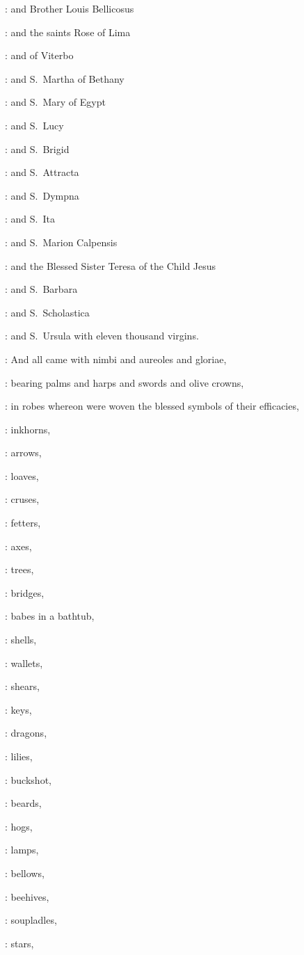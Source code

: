 :
and Brother Louis Bellicosus 

:
and the saints Rose of Lima 

:
and of Viterbo 

:
and S.~Martha of Bethany 

:
and S.~Mary of Egypt 

:
and S.~Lucy 

:
and S.~Brigid 

:
and S.~Attracta 

:
and S.~Dympna 

:
and S.~Ita 

:
and S.~Marion Calpensis 

:
and the Blessed Sister Teresa of the Child Jesus 

:
and S.~Barbara 

:
and S.~Scholastica 

:
and S.~Ursula with eleven thousand virgins.

:
And all came with nimbi and aureoles and gloriae,

:
bearing palms and harps and swords and olive crowns,

:
in robes whereon were woven the blessed symbols of their efficacies,

:
inkhorns,

:
arrows,

:
loaves,

:
cruses,

:
fetters,

:
axes,

:
trees,

:
bridges,

:
babes in a bathtub,

:
shells,

:
wallets,

:
shears,

:
keys,

:
dragons,

:
lilies,

:
buckshot,

:
beards,

:
hogs,

:
lamps,

:
bellows,

:
beehives,

:
soupladles,

:
stars,

